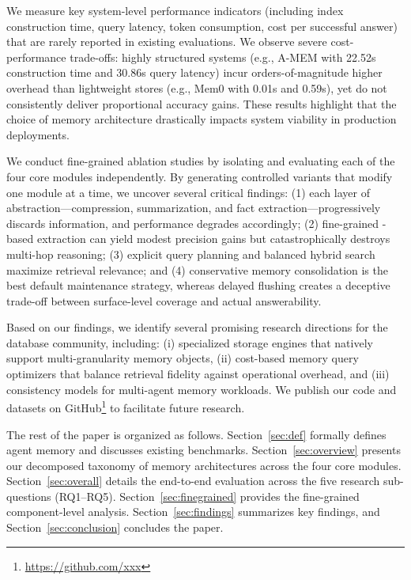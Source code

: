 We measure key system-level performance indicators (including index construction time, query latency, token consumption, cost per successful answer) that are rarely reported in existing evaluations. We observe severe cost-performance trade-offs: highly structured systems (e.g., A-MEM with 22.52s construction time and 30.86s query latency) incur orders-of-magnitude higher overhead than lightweight stores (e.g., Mem0 with 0.01s and 0.59s), yet do not consistently deliver proportional accuracy gains. These results highlight that the choice of memory architecture drastically impacts system viability in production deployments.

We conduct fine-grained ablation studies by isolating and evaluating each of the four core modules independently. By generating controlled variants that modify one module at a time, we uncover several critical findings: (1) each layer of abstraction---compression, summarization, and fact extraction---progressively discards information, and performance degrades accordingly; (2) fine-grained \llm-based extraction can yield modest precision gains but catastrophically destroys multi-hop reasoning; (3) explicit query planning and balanced hybrid search maximize retrieval relevance; and (4) conservative memory consolidation is the best default maintenance strategy, whereas delayed flushing creates a deceptive trade-off between surface-level coverage and actual answerability.

Based on our findings, we identify several promising research directions for the database community, including: (i) specialized storage engines that natively support multi-granularity memory objects, (ii) cost-based memory query optimizers that balance retrieval fidelity against operational overhead, and (iii) consistency models for multi-agent memory workloads. We publish our code and datasets on GitHub\footnote{\url{https://github.com/xxx}}  to facilitate future research.

The rest of the paper is organized as follows. Section~\ref{sec:def} formally defines agent memory and discusses existing benchmarks. Section~\ref{sec:overview} presents our decomposed taxonomy of memory architectures across the four core modules. Section~\ref{sec:overall} details the end-to-end evaluation across the five research sub-questions (RQ1--RQ5). Section~\ref{sec:finegrained} provides the fine-grained component-level analysis. Section~\ref{sec:findings} summarizes key findings, and Section~\ref{sec:conclusion} concludes the paper.
\fi


